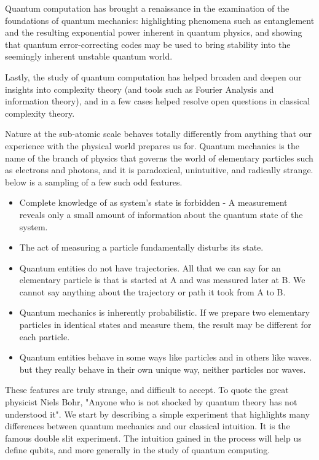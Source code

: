 \documentclass[12pt, oneside]{book}
\theoremstyle{definition}
\theoremstyle{definition}
\theoremstyle{remark}
\begin{document}
Quantum computation has brought a renaissance in the examination of the foundations of quantum mechanics: highlighting phenomena such as entanglement and the resulting exponential power inherent in quantum physics, and showing that quantum error-correcting codes may be used to bring stability into the seemingly inherent unstable quantum world.

Lastly, the study of quantum computation has helped broaden and deepen our insights into complexity theory (and tools such as Fourier Analysis and information theory), and in a few cases helped resolve open questions in classical complexity theory.

Nature at the sub-atomic scale behaves totally differently from anything that our experience with the physical world prepares us for. Quantum mechanics is the name of the branch of physics that governs the world of elementary particles such as electrons and photons, and it is paradoxical, unintuitive, and radically strange. below is a sampling of a few such odd features.
\begin{itemize}
    \item Complete knowledge of as system's state is forbidden - A measurement reveals only a small amount of information about the quantum state of the system.
    \item The act of measuring a particle fundamentally disturbs its state.
    \item Quantum entities do not have trajectories. All that we can say for an elementary particle is that is started at A and was measured later at B. We cannot say anything about the trajectory or path it took from A to B.
    \item Quantum mechanics is inherently probabilistic. If we prepare two elementary particles in identical states and measure them, the result may be different for each particle.
    \item Quantum entities behave in some ways like particles and in others like waves. but they really behave in their own unique way, neither particles nor waves.
\end{itemize}
These features are truly strange, and difficult to accept. To quote the great physicist Niels Bohr, "Anyone who is not shocked by quantum theory has not understood it". We start by describing a simple experiment that highlights many differences between quantum mechanics and our classical intuition. It is the famous double slit experiment. The intuition gained in the process will help us define qubits, and more generally in the study of quantum computing.
\end{document}
